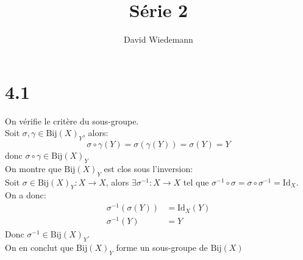 \documentclass[11pt, a4paper, twoside]{article}
\newcommand{\Bij}{\mathrm{Bij}}
\newcommand{\Id}{\mathrm{Id}}
\begin{document}
\title{Série 2}
\author{David Wiedemann}
\maketitle
\section*{4.1}
On vérifie le critère du sous-groupe.\\
Soit $\sigma, \gamma \in \Bij(X)_Y $, alors:
\[ 
	\sigma \circ \gamma (Y)=\sigma(\gamma(Y))= \sigma(Y) = Y
\]
donc $\sigma \circ \gamma \in \Bij(X)_Y$\\
On montre que $\Bij(X)_Y$ est clos sous l'inversion:\\
Soit $\sigma \in \Bij(X)_Y: X \to X$, alors $\exists \sigma^{-1}: X \to X$ tel que $\sigma^{-1}\circ \sigma = \sigma \circ \sigma^{-1} = \Id_X$. On a donc:
\begin{align*}
	\sigma^{-1}(\sigma(Y)) &= \Id_X(Y)\\
	\sigma^{-1}(Y) &= Y
\end{align*}
Donc $\sigma^{-1} \in \Bij(X)_Y$.\\
On en conclut que $\Bij(X)_Y$ forme un sous-groupe de $\Bij(X)$
\end{document}
